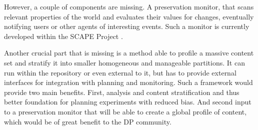 However, a couple of components are missing. A preservation monitor, that scans relevant properties of the world and evaluates their values for changes, eventually notifying users or other agents of interesting events. Such a monitor is currently developed within the SCAPE Project \cite{becker-ipres2012}.

Another crucial part that is missing is a method able to profile a massive content set and stratify it into smaller homogeneous and manageable partitions. It can run within the repository or even external to it, but has to provide external interfaces for integration with planning and monitoring. Such a framework would provide two main benefits. First, analysis and content stratification and thus better foundation for planning experiments with reduced bias. And second input to a preservation monitor that will be able to create a global profile of content, which would be of great benefit to the DP community.


